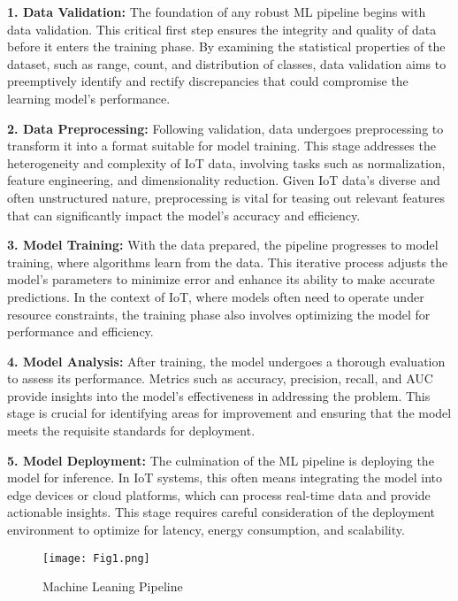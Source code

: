 \documentclass[11pt]{article}
\begin{document}
	\textbf{1. Data Validation:} The foundation of any robust ML pipeline begins with data
	validation. This critical first step ensures the integrity and quality of data before
	it enters the training phase. By examining the statistical properties of the dataset, such as range, count, and distribution of classes, data validation aims to
	preemptively identify and rectify discrepancies that could compromise the learning model’s performance.
	
	\textbf{2. Data Preprocessing:} Following validation, data undergoes preprocessing to transform it into a format suitable for model training. This stage addresses the heterogeneity and complexity of IoT data, involving tasks such as normalization, feature
	engineering, and dimensionality reduction. Given IoT data’s diverse and often
	unstructured nature, preprocessing is vital for teasing out relevant features that
	can significantly impact the model’s accuracy and efficiency.
	
	\textbf{3. Model Training:} With the data prepared, the pipeline progresses to model training,
	where algorithms learn from the data. This iterative process adjusts the model’s
	parameters to minimize error and enhance its ability to make accurate predictions. In the context of IoT, where models often need to operate under resource constraints, the training phase also involves optimizing the model for performance
	and efficiency.
	
	\textbf{4. Model Analysis:} After training, the model undergoes a thorough evaluation to
	assess its performance. Metrics such as accuracy, precision, recall, and AUC
	provide insights into the model’s effectiveness in addressing the problem. This
	stage is crucial for identifying areas for improvement and ensuring that the model
	meets the requisite standards for deployment.
	
	\textbf{5. Model Deployment:}  The culmination of the ML pipeline is deploying the model
	for inference. In IoT systems, this often means integrating the model into edge
	devices or cloud platforms, which can process real-time data and provide actionable insights. This stage requires careful consideration of the deployment environment to optimize for latency, energy consumption, and scalability.
	
	\begin{figure}[t]
		\centering
		\texttt{[image: Fig1.png]}
		\caption{Machine Leaning Pipeline \cite{c23}}
	\end{figure}
	
\end{document}
